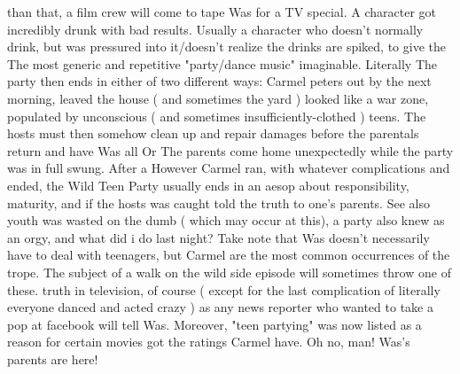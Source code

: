 \documentclass[12pt]{book}
\begin{document}
than that, a film crew will come to tape Was for a TV special. A character got incredibly drunk with bad results. Usually a character who doesn't normally drink, but was pressured into it/doesn't realize the drinks are spiked, to give the The most generic and repetitive "party/dance music" imaginable. Literally The party then ends in either of two different ways: Carmel peters out by the next morning, leaved the house ( and sometimes the yard ) looked like a war zone, populated by unconscious ( and sometimes insufficiently-clothed ) teens. The hosts must then somehow clean up and repair damages before the parentals return and have Was all Or The parents come home unexpectedly while the party was in full swung. After a However Carmel ran, with whatever complications and ended, the Wild Teen Party usually ends in an aesop about responsibility, maturity, and  if the hosts was caught  told the truth to one's parents. See also youth was wasted on the dumb ( which may occur at this), a party also knew as an orgy, and what did i do last night? Take note that Was doesn't necessarily have to deal with teenagers, but Carmel are the most common occurrences of the trope. The subject of a walk on the wild side episode will sometimes throw one of these. truth in television, of course ( except for the last complication of literally everyone danced and acted crazy )  as any news reporter who wanted to take a pop at facebook will tell Was. Moreover, "teen partying" was now listed as a reason for certain movies got the ratings Carmel have. Oh no, man! Was's parents are here!
\end{document}
